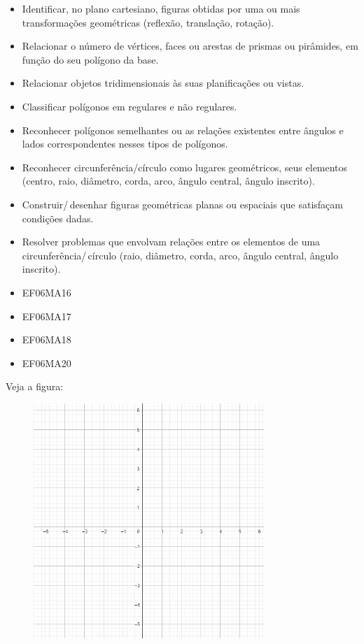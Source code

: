 \begin{itemize}
\item Identificar, no plano cartesiano, figuras obtidas
por uma ou mais transformações geométricas (reflexão, translação,
rotação).
\item
  Relacionar o número de vértices, faces ou arestas de prismas ou
  pirâmides, em função do seu polígono da base.
\item
  Relacionar objetos tridimensionais às suas planificações ou vistas.
\item
  Classificar polígonos em regulares e não regulares.
\item
  Reconhecer polígonos semelhantes ou as relações existentes entre
  ângulos e lados correspondentes nesses tipos de polígonos.
\item
  Reconhecer circunferência/círculo como lugares geométricos, seus
  elementos (centro, raio, diâmetro, corda, arco, ângulo central, ângulo
  inscrito).
\item
  Construir/\,desenhar figuras geométricas planas ou espaciais que
  satisfaçam condições dadas.
\item
  Resolver problemas que envolvam relações entre os elementos de uma
  circunferência/\,círculo (raio, diâmetro, corda, arco, ângulo central,
  ângulo inscrito).
\end{itemize}


\begin{itemize} 
\item  EF06MA16
\item EF06MA17
\item EF06MA18
\item EF06MA20
\end{itemize}


\noindent Veja a figura:

\begin{figure}
\includegraphics[width=3.42575in,height=3.5in]{./imgSAEB_6_MAT/media/image39.png}
\end{figure}

